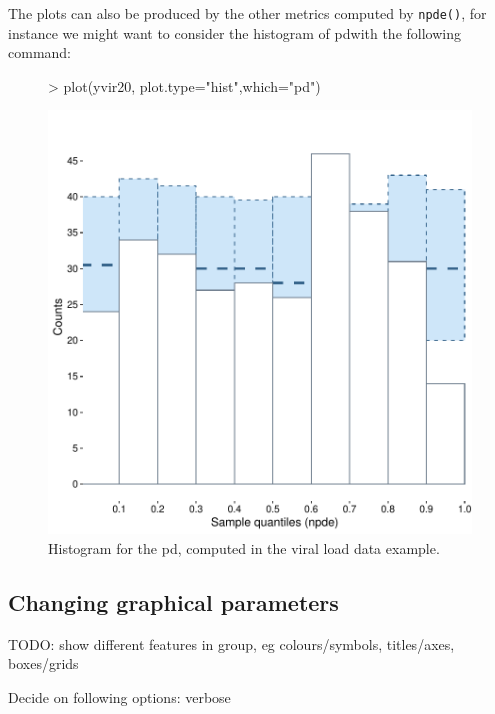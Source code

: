 \documentclass{article}
\def\pd{{\rm pd}}
\begin{document}
The plots can also be produced by the other metrics computed by \verb+npde()+, for instance we might want to consider the histogram of \pd with the following command:
\begin{figure}[!h]
\begin{center}
\begin{Schunk}
\begin{Sinput}
> plot(yvir20, plot.type="hist",which="pd")
\end{Sinput}
\end{Schunk}
\includegraphics{demoGraphs-histVL20pd}
\end{center}
\par \kern -0.5cm
\caption{Histogram for the pd, computed in the viral load data example.} \label{fig:histVL20pd}
\end{figure}

\clearpage
\newpage
\subsection{Changing graphical parameters}

\hskip 18pt TODO: show different features in group, eg colours/symbols, titles/axes, boxes/grids

Decide on following options: verbose 
\end{document}
